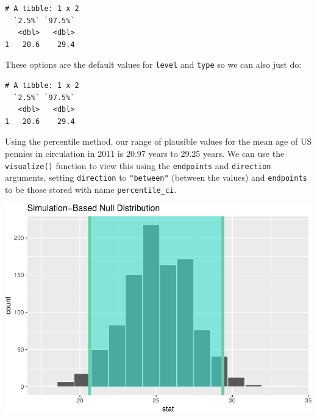 \documentclass[]{article}
\newenvironment{Shaded}{\begin{snugshade}}{\end{snugshade}}
\newcommand{\KeywordTok}[1]{\textcolor[rgb]{0.13,0.29,0.53}{\textbf{#1}}}
\newcommand{\DataTypeTok}[1]{\textcolor[rgb]{0.13,0.29,0.53}{#1}}
\newcommand{\StringTok}[1]{\textcolor[rgb]{0.31,0.60,0.02}{#1}}
\newcommand{\OperatorTok}[1]{\textcolor[rgb]{0.81,0.36,0.00}{\textbf{#1}}}
\newcommand{\NormalTok}[1]{#1}
\begin{document}
\begin{verbatim}
# A tibble: 1 x 2
  `2.5%` `97.5%`
   <dbl>   <dbl>
1   20.6    29.4
\end{verbatim}

These options are the default values for \texttt{level} and
\texttt{type} so we can also just do:

\begin{Shaded}
\end{Shaded}

\begin{verbatim}
# A tibble: 1 x 2
  `2.5%` `97.5%`
   <dbl>   <dbl>
1   20.6    29.4
\end{verbatim}

Using the percentile method, our range of plausible values for the mean
age of US pennies in circulation in 2011 is 20.97 years to 29.25 years.
We can use the \texttt{visualize()} function to view this using the
\texttt{endpoints} and \texttt{direction} arguments, setting
\texttt{direction} to \texttt{"between"} (between the values) and
\texttt{endpoints} to be those stored with name \texttt{percentile\_ci}.

\begin{Shaded}
\end{Shaded}

\includegraphics{DAWeek7_files/figure-latex/visualize3-1.pdf}
\end{document}
